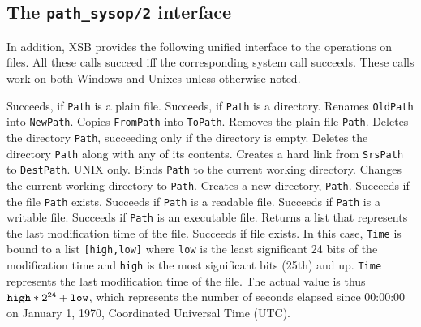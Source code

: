 \subsection{The {\tt path\_sysop/2} interface}
%
In addition, XSB provides the following unified interface to the
operations on files. All these calls succeed iff the corresponding
system call succeeds.  These calls work on both Windows and Unixes
unless otherwise noted.
\begin{description}
  Succeeds, if {\tt Path} is a plain file.
  Succeeds, if {\tt Path} is a directory.
  Renames {\tt OldPath} into {\tt NewPath}.
  Copies {\tt FromPath} into {\tt ToPath}.
  Removes the plain file {\tt Path}.
  Deletes the directory {\tt Path}, succeeding only if the directory is empty.
  Deletes the directory {\tt Path} along with any of its contents.
  Creates a hard link from {\tt SrsPath} to {\tt DestPath}. UNIX only.
  Binds {\tt Path} to the current working directory.
  Changes the current working directory to {\tt Path}.
  Creates a new directory, {\tt Path}.
  Succeeds if the file {\tt Path} exists.
  Succeeds if {\tt Path} is a readable file.
  Succeeds if {\tt Path} is a writable file.
  Succeeds if {\tt Path} is an executable file.
  Returns a list that represents the last modification time of the file.
  Succeeds if file exists. In this case, {\tt Time} is bound to a list
  {\tt [high,low]} where {\tt low} is the least significant 24 bits of the
  modification time and {\tt high} is the most significant bits (25th) and up.
  {\tt Time} represents the last modification time of the file.
  The actual value is thus $\tt high*2^{24} + low$, which represents the
  number of seconds elapsed since 00:00:00 on
       January 1, 1970, Coordinated Universal Time (UTC).

\end{description}
